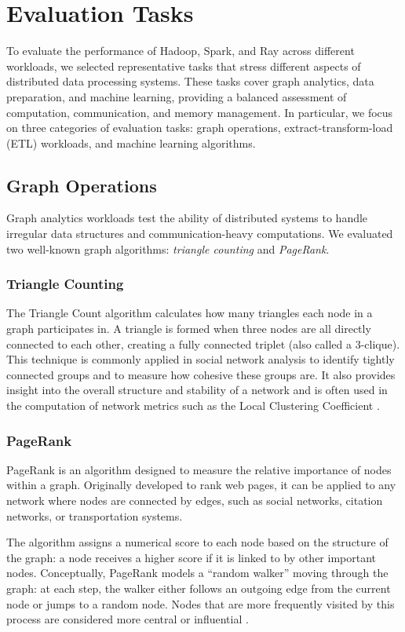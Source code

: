 \documentclass[conference]{IEEEtran}
\begin{document}
\section{Evaluation Tasks}

To evaluate the performance of Hadoop, Spark, and Ray across different
workloads, we selected representative tasks that stress different aspects
of distributed data processing systems. These tasks cover graph analytics,
data preparation, and machine learning, providing a balanced assessment of
computation, communication, and memory management. In particular, we focus
on three categories of evaluation tasks: graph operations,
extract-transform-load (ETL) workloads, and machine learning algorithms.  

\subsection{Graph Operations}

Graph analytics workloads test the ability of distributed systems to handle
irregular data structures and communication-heavy computations. We evaluated
two well-known graph algorithms: \textit{triangle counting} and
\textit{PageRank}.

\subsubsection{Triangle Counting}
The Triangle Count algorithm calculates how many triangles each node in a
graph participates in. A triangle is formed when three nodes are all
directly connected to each other, creating a fully connected triplet (also
called a 3-clique). This technique is commonly applied in social network
analysis to identify tightly connected groups and to measure how cohesive
these groups are. It also provides insight into the overall structure and
stability of a network and is often used in the computation of network
metrics such as the Local Clustering Coefficient \cite{triangles}.

\subsubsection{PageRank}
PageRank is an algorithm designed to measure the relative importance of nodes
within a graph. Originally developed to rank web pages, it can be applied to
any network where nodes are connected by edges, such as social networks,
citation networks, or transportation systems.

The algorithm assigns a numerical score to each node based on the structure
of the graph: a node receives a higher score if it is linked to by other
important nodes. Conceptually, PageRank models a “random walker” moving
through the graph: at each step, the walker either follows an outgoing edge
from the current node or jumps to a random node. Nodes that are more
frequently visited by this process are considered more central or influential
\cite{pagerank}.
\end{document}
